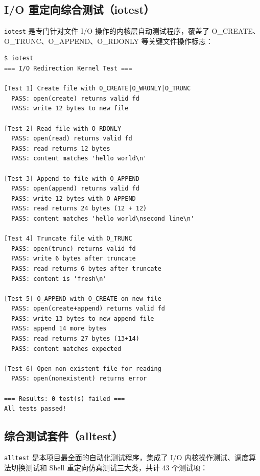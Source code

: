 \documentclass[12pt,a4paper]{ctexart}
\begin{document}
\subsection{I/O 重定向综合测试（iotest）}

\texttt{iotest} 是专门针对文件 I/O 操作的内核层自动测试程序，覆盖了 O\_CREATE、O\_TRUNC、O\_APPEND、O\_RDONLY 等关键文件操作标志：

\begin{lstlisting}[caption={iotest 运行结果}]
$ iotest
=== I/O Redirection Kernel Test ===

[Test 1] Create file with O_CREATE|O_WRONLY|O_TRUNC
  PASS: open(create) returns valid fd
  PASS: write 12 bytes to new file

[Test 2] Read file with O_RDONLY
  PASS: open(read) returns valid fd
  PASS: read returns 12 bytes
  PASS: content matches 'hello world\n'

[Test 3] Append to file with O_APPEND
  PASS: open(append) returns valid fd
  PASS: write 12 bytes with O_APPEND
  PASS: read returns 24 bytes (12 + 12)
  PASS: content matches 'hello world\nsecond line\n'

[Test 4] Truncate file with O_TRUNC
  PASS: open(trunc) returns valid fd
  PASS: write 6 bytes after truncate
  PASS: read returns 6 bytes after truncate
  PASS: content is 'fresh\n'

[Test 5] O_APPEND with O_CREATE on new file
  PASS: open(create+append) returns valid fd
  PASS: write 13 bytes to new append file
  PASS: append 14 more bytes
  PASS: read returns 27 bytes (13+14)
  PASS: content matches expected

[Test 6] Open non-existent file for reading
  PASS: open(nonexistent) returns error

=== Results: 0 test(s) failed ===
All tests passed!
\end{lstlisting}

\subsection{综合测试套件（alltest）}

\texttt{alltest} 是本项目最全面的自动化测试程序，集成了 I/O 内核操作测试、调度算法切换测试和 Shell 重定向仿真测试三大类，共计 43 个测试项：
\end{document}
